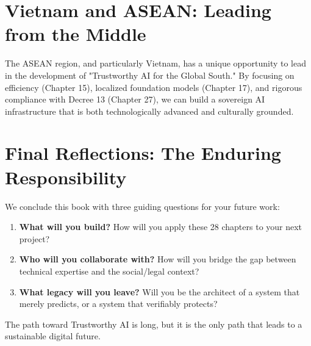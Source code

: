 \section{Vietnam and ASEAN: Leading from the Middle}
\label{sec:asean_vision}

The ASEAN region, and particularly Vietnam, has a unique opportunity to lead in the development of "Trustworthy AI for the Global South." By focusing on efficiency (Chapter 15), localized foundation models (Chapter 17), and rigorous compliance with Decree 13 (Chapter 27), we can build a sovereign AI infrastructure that is both technologically advanced and culturally grounded.

\section{Final Reflections: The Enduring Responsibility}
\label{sec:final_reflections}

We conclude this book with three guiding questions for your future work:
\begin{enumerate}
    \item \textbf{What will you build?} How will you apply these 28 chapters to your next project?
    \item \textbf{Who will you collaborate with?} How will you bridge the gap between technical expertise and the social/legal context?
    \item \textbf{What legacy will you leave?} Will you be the architect of a system that merely predicts, or a system that verifiably protects?
\end{enumerate}

The path toward Trustworthy AI is long, but it is the only path that leads to a sustainable digital future.


